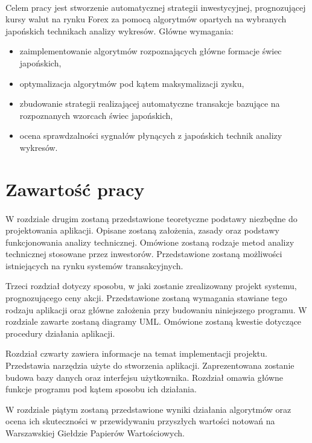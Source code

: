 \documentclass[pdflatex,11pt]{aghdpl}
\begin{document}
\paragraph{}
Celem pracy jest stworzenie automatycznej strategii inwestycyjnej, prognozującej kursy walut na rynku Forex za pomocą algorytmów opartych na wybranych japońskich technikach analizy wykresów. Główne wymagania:
\begin{itemize}
\item
zaimplementowanie algorytmów rozpoznających główne formacje świec japońskich,
\item
optymalizacja algorytmów pod kątem maksymalizacji zysku,
\item
zbudowanie strategii realizającej automatyczne transakcje bazujące na rozpoznanych wzorcach świec japońskich,
\item
ocena sprawdzalności sygnałów płynących z japońskich technik analizy wykresów.
\end{itemize}
\section{Zawartość pracy}
\paragraph{}
W rozdziale drugim zostaną przedstawione teoretyczne podstawy niezbędne do projektowania aplikacji. Opisane zostaną założenia, zasady oraz podstawy funkcjonowania analizy technicznej. Omówione zostaną rodzaje metod analizy technicznej stosowane przez inwestorów. Przedstawione zostaną możliwości istniejących na rynku systemów transakcyjnych.

Trzeci rozdział dotyczy sposobu, w jaki zostanie zrealizowany projekt systemu, prognozującego ceny akcji. Przedstawione zostaną wymagania stawiane tego rodzaju aplikacji oraz główne założenia przy budowaniu niniejszego programu. W rozdziale zawarte zostaną diagramy UML. Omówione zostaną kwestie dotyczące procedury działania aplikacji.

Rozdział czwarty zawiera informacje na temat implementacji projektu. Przedstawia narzędzia użyte do stworzenia aplikacji. Zaprezentowana zostanie budowa bazy danych oraz interfejsu użytkownika. Rozdział omawia główne funkcje programu pod kątem sposobu ich działania.

W rozdziale piątym zostaną przedstawione wyniki działania algorytmów oraz ocena ich skuteczności w przewidywaniu przyszłych wartości notowań na Warszawskiej Giełdzie Papierów Wartościowych.  
\end{document}
